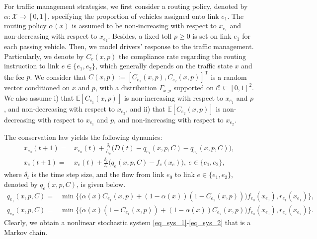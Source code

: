 For traffic management strategies, we first consider a routing policy, denoted by $\alpha:\mathcal{X}\to[0,1]$, specifying the proportion of vehicles assigned onto link $e_1$. The routing policy $\alpha(x)$ is assumed to be non-increasing with respect to $x_{e_1}$ and non-decreasing with respect to $x_{e_2}$. Besides, a fixed toll $p\geq0$ is set on link $e_1$ for each passing vehicle. Then, we model drivers' response to the traffic management. Particularly, we denote by $C_e(x,p)$ the compliance rate regarding the routing instruction to link $e\in\{e_1,e_2\}$, which generally depends on the traffic state $x$ and the fee $p$. We consider that $C(x,p):=[C_{e_1}(x,p), C_{e_2}(x,p)]^{\mathrm{T}}$ is a random vector conditioned on $x$ and $p$, with a distribution $\Gamma_{x,p}$ supported on $\mathcal{C}\subseteq[0,1]^2$. We also assume i) that $\mathbb{E}[C_{e_1}(x,p)]$ is non-increasing with respect to $x_{e_1}$ and $p$, and non-decreasing with respect to $x_{e_2}$, and ii) that $\mathbb{E}[C_{e_2}(x,p)]$ is non-decreasing with respect to $x_{e_1}$ and $p$, and non-increasing with respect to $x_{e_2}$.

The conservation law yields the following dynamics:
\begin{subequations}
    \begin{align}
        x_{e_0}(t+1) =& x_{e_0}(t) + \frac{\delta_t}{l_{e_0}}\Big(D(t)-q_{e_1}(x,p,C)-q_{e_2}(x,p,C)\Big), \label{eq_sys_1} \\
        x_{e}(t+1) =& x_{e}(t) + \frac{\delta_t}{l_{e}}\Big(q_{e}(x,p,C)-f_{e}(x_e)\Big),~ e\in\{e_1, e_2\}, \label{eq_sys_2}
    \end{align}
\end{subequations}
where $\delta_t$ is the time step size, and the flow from link $e_0$ to link $e\in\{e_1, e_2\}$, denoted by $q_{e}(x, p, C)$, is given below. 
\begin{subequations}
    \begin{align}
            q_{e_1}(x, p, C) =& \min\Big\{\Big(\alpha(x)C_{e_1}(x,p) + (1-\alpha(x))(1-C_{e_2}(x,p))\Big)f_{e_0}(x_{e_0}), r_{e_1}(x_{e_1})\Big\}, \label{eq_q_1} \\
            q_{e_2}(x, p, C) =& \min\Big\{\Big(\alpha(x)(1-C_{e_1}(x,p)) + (1-\alpha(x))C_{e_2}(x,p)\Big)f_{e_0}(x_{e_0}), r_{e_2}(x_{e_2})\Big\}. \label{eq_q_2}
    \end{align}
\end{subequations}
Clearly, we obtain a nonlinear stochastic system \eqref{eq_sys_1}-\eqref{eq_sys_2} that is a Markov chain. 

